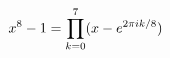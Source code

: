 \documentclass[preview]{standalone}
\begin{document}
\begin{align*}
\special{dvisvgm:raw <g id='unique000'>}x^8-1=\prod_{k=0}^7(x-e^{2\pi ik/8})\special{dvisvgm:raw </g>}
\end{align*}
\end{document}
